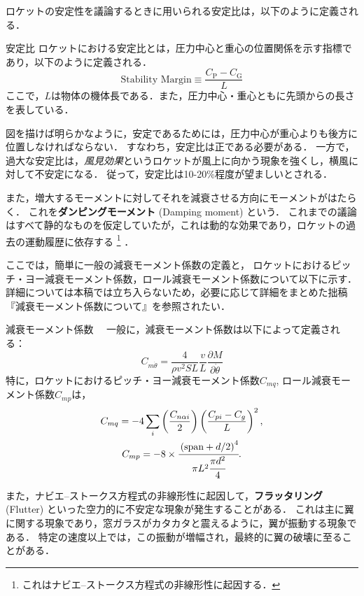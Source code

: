 \documentclass[uplatex,dvipdfmx,a4j,11pt]{jsreport}
\newcommand{\keyword}[1]{\textcolor{mainblue}{\textbf{#1}}}
\numberwithin{equation}{chapter}
\begin{document}
ロケットの安定性を議論するときに用いられる安定比は，以下のように定義される．
\begin{definition}{安定比}{}
  ロケットにおける安定比とは，圧力中心と重心の位置関係を示す指標であり，以下のように定義される．
    \begin{equation}
      \text{Stability Margin} \equiv \frac{C_\mathrm{P} - C_\mathrm{G}}{L}
    \end{equation}
  ここで，$L$は物体の機体長である．また，圧力中心・重心ともに先頭からの長さを表している．
\end{definition}
図を描けば明らかなように，安定であるためには，圧力中心が重心よりも後方に位置しなければならない．
すなわち，安定比は正である必要がある．
一方で，過大な安定比は，\emph{風見効果}というロケットが風上に向かう現象を強くし，横風に対して不安定になる．
従って，安定比は10-20\%程度が望ましいとされる．

\enskip

また，増大するモーメントに対してそれを減衰させる方向にモーメントがはたらく．
これを\keyword{ダンピングモーメント} (Damping moment) という．
これまでの議論はすべて静的なものを仮定していたが，これは動的な効果であり，ロケットの過去の運動履歴に依存する
\footnote{これはナビエ--ストークス方程式の非線形性に起因する．} ．

ここでは，簡単に一般の減衰モーメント係数の定義と，
ロケットにおけるピッチ・ヨー減衰モーメント係数，ロール減衰モーメント係数について以下に示す．
詳細については本稿では立ち入らないため，必要に応じて詳細をまとめた拙稿『減衰モーメント係数について』を参照されたい．
\begin{definition}{減衰モーメント係数}{}{}
  　一般に，減衰モーメント係数は以下によって定義される：
  \begin{equation}
  C_{m\dot{\theta}} = \frac{4}{\rho v^2 S L}\frac{v}{L}\frac{\partial M}{\partial\dot{\theta}} \label{fte_def}
\end{equation}
特に，ロケットにおけるピッチ・ヨー減衰モーメント係数$C_{mq}$, ロール減衰モーメント係数$C_{mp}$は，
\begin{gather}
  C_{mq} = - 4 \sum_i \left(\frac{C_{n\alpha i}}{2}\right)\left(\frac{C_{pi} - C_{g}}{L}\right)^2,\\
  C_{mp} = - 8 \times \cfrac{\left(\mathrm{span} + d/2\right)^4}{\pi L^2 \cfrac{\pi d^2}{4}}.
\end{gather}
\end{definition}

\enskip

また，ナビエ--ストークス方程式の非線形性に起因して，\keyword{フラッタリング} (Flutter) といった空力的に不安定な現象が発生することがある．
これは主に翼に関する現象であり，窓ガラスがカタカタと震えるように，翼が振動する現象である．
特定の速度以上では，この振動が増幅され，最終的に翼の破壊に至ることがある．
\end{document}

